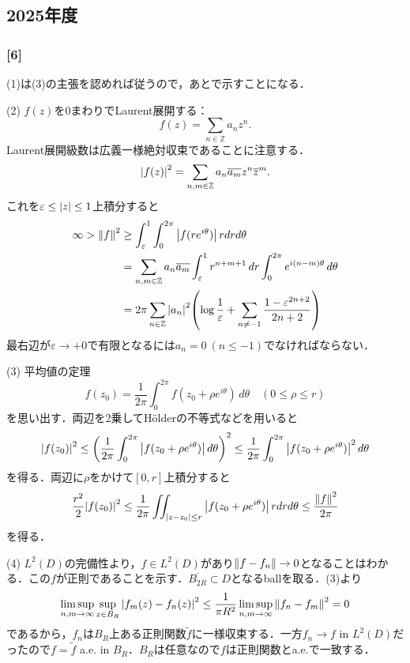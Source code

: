 \documentclass[a4j]{ltjsarticle}
\newcommand{\Zset}{\mathbb{Z}}
\newcommand{\1}{\mathbbm{1}}
\numberwithin{equation}{section}
\theoremstyle{definition}
\begin{document}
\subsection{2025年度}
\subsubsection*{[6]}
(1)は(3)の主張を認めれば従うので，あとで示すことになる．

(2) $f(z)$を$0$まわりでLaurent展開する：
\begin{equation}
    f(z)=\sum_{n\in\Zset}a_nz^n.
\end{equation}
Laurent展開級数は広義一様絶対収束であることに注意する．
\begin{equation}
    \abs{f(z)}^2=\sum_{n,m\in\Zset}a_n\overline{a_m}z^n\overline{z}^m.
\end{equation}
これを$\varepsilon\leq \abs{z}\leq 1$上積分すると
\begin{align}
    \infty>\norm{f}^2&\geq \int_{\varepsilon}^{1}\int_{0}^{2\pi}\abs{f(re^{i\theta})}\,rdrd\theta\\
    &=\sum_{n,m\in\Zset}a_n\overline{a_m}\int_{\varepsilon}^{1}r^{n+m+1}\,dr\int_{0}^{2\pi}e^{i(n-m)\theta}\,d\theta\\
    &=2\pi\sum_{n\in\Zset}\abs{a_n}^2\qty(\log\frac{1}{\varepsilon}+\sum_{n\neq-1}\frac{1-\varepsilon^{2n+2}}{2n+2})
\end{align}
最右辺が$\varepsilon\to+0$で有限となるには$a_n=0\ (n\leq -1)$でなければならない．

(3) 平均値の定理
\begin{equation}
    f(z_0)=\frac{1}{2\pi}\int_{0}^{2\pi}f(z_0+\rho e^{i\theta})\,d\theta\quad (0\leq \rho\leq r)
\end{equation}
を思い出す．両辺を2乗してHölderの不等式などを用いると
\begin{equation}
    \abs{f(z_0)}^2\leq \qty(\frac{1}{2\pi}\int_{0}^{2\pi}\abs{f(z_0+\rho e^{i\theta})}\,d\theta)^2\leq\frac{1}{2\pi}\int_{0}^{2\pi}\abs{f(z_0+\rho e^{i\theta})}^2\,d\theta 
\end{equation}
を得る．両辺に$\rho$をかけて$[0,r]$上積分すると
\begin{equation}
    \frac{r^2}{2}\abs{f(z_0)}^2\leq \frac{1}{2\pi}\iint_{\abs{z-z_0}\leq r}\abs{f(z_0+\rho e^{i\theta})}\,rdrd\theta\leq\frac{\norm{f}^2}{2\pi} 
\end{equation}
を得る．

(4) $L^2(D)$の完備性より，$f\in L^2(D)$があり$\norm{f-f_n}\to0$となることはわかる．この$f$が正則であることを示す．$\overline{B_{2R}}\subset D$となるballを取る．(3)より
\begin{equation}
    \limsup_{n,m\to\infty}\sup_{z\in B_R}\abs{f_m(z)-f_n(z)}^2\leq \frac{1}{\pi R^2}\limsup_{n,m\to\infty}\norm{f_n-f_m}^2=0
\end{equation}
であるから，$f_n$は$B_R$上ある正則関数$\widetilde{f}$に一様収束する．一方$f_n\to f$ in $L^2(D)$だったので$f=\widetilde{f}$ a.e. in $B_R$．$B_R$は任意なので$f$は正則関数とa.e.で一致する．
\end{document}
